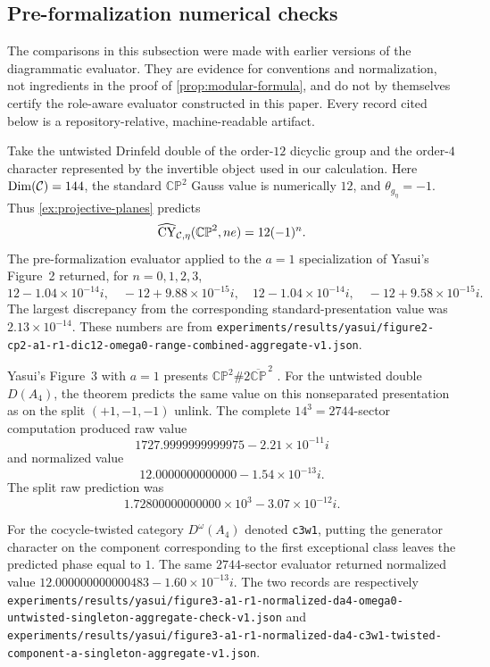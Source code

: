\subsection{Pre-formalization numerical checks}
\label{app:numerical-checks}

The comparisons in this subsection were made with earlier versions of the
diagrammatic evaluator.  They are evidence for conventions and normalization,
not ingredients in the proof of \cref{prop:modular-formula}, and do not by
themselves certify the role-aware evaluator constructed in this paper.  Every
record cited below is a repository-relative, machine-readable artifact.

\begin{example}
\label{ex:dic3-cp2-numerical}
Take the untwisted Drinfeld double of the order-$12$ dicyclic group and the
order-$4$ character represented by the invertible object used in our
calculation.  Here $\operatorname{Dim}(\mathcal{C})=144$, the standard
$\mathbb{CP}^2$ Gauss value is numerically $12$, and
$\theta_{g_\eta}=-1$.  Thus \cref{ex:projective-planes} predicts
\[
 \widehat{\operatorname{CY}}_{\mathcal{C},\eta}(\mathbb{CP}^2,ne)=12(-1)^n.
\]
The pre-formalization evaluator applied to the $a=1$ specialization of
Yasui's Figure~2 \cite{Yasui2008} returned, for $n=0,1,2,3$,
\[
 12-1.04\!\times\!10^{-14}i,
 \quad -12+9.88\!\times\!10^{-15}i,
 \quad 12-1.04\!\times\!10^{-14}i,
 \quad -12+9.58\!\times\!10^{-15}i.
\]
The largest discrepancy from the corresponding standard-presentation value
was $2.13\times10^{-14}$.  These numbers are from
\nolinkurl{experiments/results/yasui/figure2-cp2-a1-r1-dic12-omega0-range-combined-aggregate-v1.json}.
\end{example}

\begin{example}
\label{ex:da4-yasui-a1}
Yasui's Figure~3 with $a=1$ presents
$\mathbb{CP}^2\#2\overline{\mathbb{CP}}^{\,2}$ \cite{Yasui2008}.  For the
untwisted double $D(A_4)$, the theorem predicts the same value on this
nonseparated presentation as on the split $(+1,-1,-1)$ unlink.  The complete
$14^3=2744$-sector computation produced raw value
\[
 1727.9999999999975-2.21\times10^{-11}i
\]
and normalized value
\[
 12.0000000000000-1.54\times10^{-13}i.
\]
The split raw prediction was
\[
 1.72800000000000\times10^3-3.07\times10^{-12}i.
\]

For the cocycle-twisted category $D^{\omega}(A_4)$ denoted \texttt{c3w1},
putting the generator character on the component corresponding to the first
exceptional class leaves the predicted phase equal to $1$.  The same
$2744$-sector evaluator returned normalized value
$12.000000000000483-1.60\times10^{-13}i$.  The two records are respectively
\nolinkurl{experiments/results/yasui/figure3-a1-r1-normalized-da4-omega0-untwisted-singleton-aggregate-check-v1.json}
and
\nolinkurl{experiments/results/yasui/figure3-a1-r1-normalized-da4-c3w1-twisted-component-a-singleton-aggregate-v1.json}.
\end{example}

